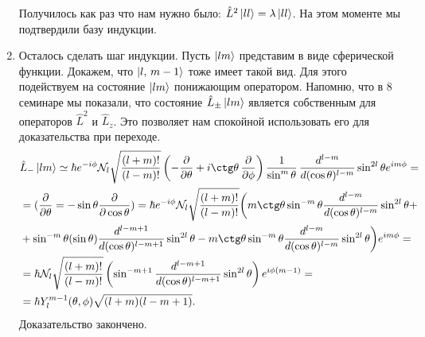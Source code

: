 \begin{enumerate}
    Получилось как раз что нам нужно было: $\hat{L}^2 \ket{ll} = \lambda \ket{ll}$. На этом моменте мы подтвердили базу индукции.
    \item Осталось сделать шаг индукции. Пусть $\ket{lm}$ представим в виде сферической функции. Докажем, что $\ket{l,\, m-1}$ тоже имеет такой вид. Для этого подействуем на состояние $\ket{lm}$ понижающим оператором. Напомню, что в 8 семинаре мы показали, что состояние $\hat{L}_{\pm}\ket{lm}$ является собственным для операторов $\hat{L}^2$ и $\hat{L}_z$. Это позволяет нам спокойной использовать его для доказательства при переходе.
    \begin{align*}
        &\hat{L}_-\ket{lm} \simeq \hbar e^{-i\phi}\mathcal{N}_l\sqrt{\frac{(l+m)!}{(l-m)!}}\left(-\frac{\partial}{\partial \theta} + i \ctg\theta\,\frac{\partial}{\partial \phi} \right)  \frac{1}{\sin^{m}\theta}\,\frac{d^{l-m}}{d(\cos\theta)^{l-m}}\sin^{2l}\theta e^{im\phi} = \\
        & = (\frac{\partial}{\partial \theta} =  -\sin\theta\frac{\partial}{\partial\cos\theta}) = \hbar e^{-i\phi}\mathcal{N}_l\sqrt{\frac{(l+m)!}{(l-m)!}}\biggl(m\ctg\theta\sin^{-m}\theta\frac{d^{l-m}}{d(\cos\theta)^{l-m}}\sin^{2l}\theta + \\
        & + \sin^{-m}\theta(\sin\theta)\frac{d^{l-m+1}}{d(\cos\theta)^{l-m+1}} \sin^{2l}\theta - m\ctg\theta\sin^{-m}\theta\frac{d^{l-m}}{d(\cos\theta)^{l-m}} \sin^{2l}\theta \biggl)e^{im\phi} = \\
        & = \hbar\mathcal{N}_l\sqrt{\frac{(l+m)!}{(l-m)!}}\left( \sin^{-m+1}\frac{d^{l-m+1}}{d(\cos\theta)^{l-m+1}} \sin^{2l}\theta  \right)e^{i\phi(m-1)} = \\
        & =\hbar Y^{m-1}_l(\theta, \phi)\sqrt{(l+m)(l-m+1)}.
    \end{align*}
    Доказательство закончено.
\end{enumerate}